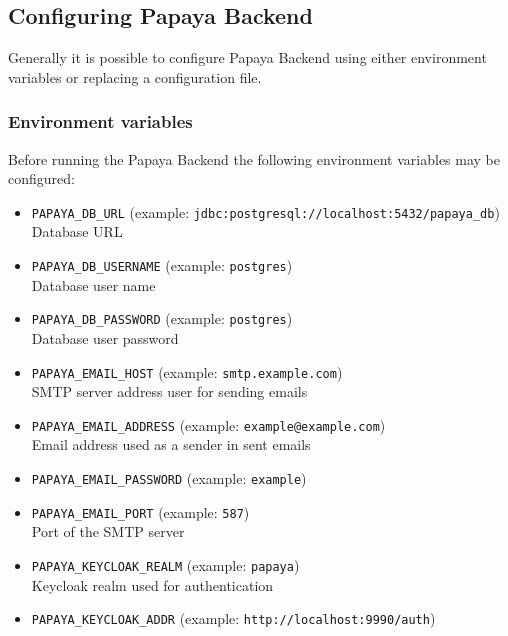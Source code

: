 \subsection{Configuring Papaya Backend}\label{subsec:configuring-papaya-backend}

Generally it is possible to configure Papaya Backend using either environment
variables or replacing a configuration file.

\subsubsection*{Environment variables}

Before running the Papaya Backend the following environment variables may be
configured:

\begin{itemize}
    \setlength\itemsep{0em}
    \item \texttt{PAPAYA\_DB\_URL} (example: \texttt{jdbc:postgresql://localhost:5432/papaya\_db}) \\
    Database URL \\
    \item \texttt{PAPAYA\_DB\_USERNAME} (example: \texttt{postgres}) \\
    Database user name
    \item \texttt{PAPAYA\_DB\_PASSWORD} (example: \texttt{postgres}) \\
    Database user password
    \item \texttt{PAPAYA\_EMAIL\_HOST} (example: \texttt{smtp.example.com}) \\
    SMTP server address user for sending emails
    \item \texttt{PAPAYA\_EMAIL\_ADDRESS} (example: \texttt{example@example.com}) \\
    Email address used as a sender in sent emails
    \item \texttt{PAPAYA\_EMAIL\_PASSWORD} (example: \texttt{example}) \\
    \item \texttt{PAPAYA\_EMAIL\_PORT} (example: \texttt{587}) \\
    Port of the SMTP server
    \item \texttt{PAPAYA\_KEYCLOAK\_REALM} (example: \texttt{papaya}) \\
    Keycloak realm used for authentication
    \item \texttt{PAPAYA\_KEYCLOAK\_ADDR} (example: \texttt{http://localhost:9990/auth}) \\

\end{itemize}
